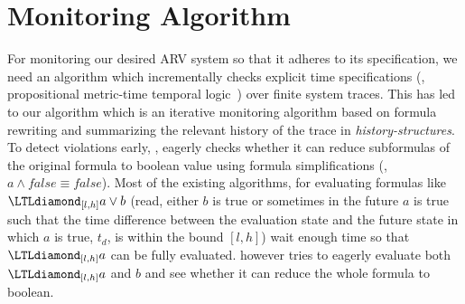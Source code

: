 
\section{Monitoring Algorithm}

For monitoring our desired ARV system so that it adheres to its specification, 
we need an algorithm which %
incrementally checks explicit time specifications (\ie, propositional metric-time temporal logic~\cite{Koymans1990}) over finite system traces. 
This has led to our algorithm \monitor which is an iterative monitoring algorithm based on formula rewriting and summarizing the relevant history of the trace 
in \emph{history-structures}. To detect violations early, \monitor, eagerly checks whether it can reduce subformulas of the original formula to boolean value 
using formula simplifications (\eg, $a\wedge \mathit{false} \equiv \mathit{false}$). Most of the existing algorithms, for evaluating  formulas like $\eventually_{[l,h]} a \vee b$ (read, 
either $b$ is true or sometimes in the future $a$ is true such that the time difference between the evaluation state and the future state in which $a$ is true, $t_d$, is within the bound $[l,h]$) wait 
enough time so that $\eventually_{[l,h]} a$ can be fully evaluated. \monitor however tries to eagerly evaluate both $\eventually_{[l,h]} a$ and $b$ and see whether it can 
reduce the whole formula to boolean.
%

